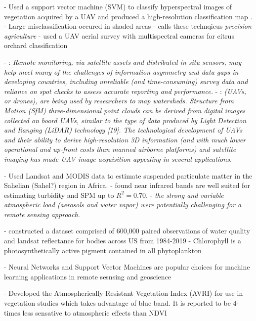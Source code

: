 \documentclass[journal,article,submit,pdftex,moreauthors]{Definitions/mdpi}
\begin{document}
- Used a support vector machine (SVM) to classify hyperspectral images of vegetation acquired by a UAV and produced a high-resolution classification map \cite{uav-hsi-classification}.
- Large misclassification occured in shaded areas
- \cite{uav-hsi-classification} calls these technqieus \textit{precision agriculture}
- \cite{uav-hsi-classification-2} used a UAV aerial survey with multispectral cameras for citrus orchard classification

- \cite{andres2018review}: \textit{Remote monitoring, via satellite assets and distributed in situ sensors, may help meet many of the challenges of information asymmetry and data gaps in developing countries, including unreliable (and time-consuming) survey data and reliance on spot checks to assess accurate reporting and performance.}
- \cite{andres2018review}: \textit{(UAVs, or drones), are being used by researchers to map watersheds. Structure from Motion (SfM) three-dimensional point clouds can be derived from digital images collected on board UAVs, similar to the type of data produced by Light Detection and Ranging (LiDAR) technology [19]. The technological development of UAVs and their ability to derive high-resolution 3D information (and with much lower operational and up-front costs than manned airborne platforms) and satellite imaging has made UAV image acquisition appealing in several applications.}

- \cite{robert2017analysis} Used Landsat and MODIS data to estimate suspended particulate matter in the Sahelian (Sahel?) region in Africa. 
- \cite{robert2017analysis} found near infrared bands are well suited for estimating turbidity and SPM up to $R^2=0.70$.
- \cite{robert2017analysis} \textit{the strong and variable atmospheric load (aerosols and water vapor) were potentially challenging for a remote sensing approach.}

- \cite{ross2019aquasat} constructed a dataset comprised of 600,000 paired observations of water quality and landsat reflectance for bodies across US from 1984-2019
- Chlorophyll is a photosynthetically active pigment contained in all phytoplankton

- \cite{lary2010artificial} Neural Networks and Support Vector Machines are popular choices for machine learning applications in remote sesnsing and geoscience


- \cite{kaufman1992atmospherically} Developed the Atmospherically Resistant Vegetation Index (AVRI) for use in vegetation studies which takes advantage of blue band. It is reported to be 4-times less sensative to atmospheric effects than NDVI
\end{document}
